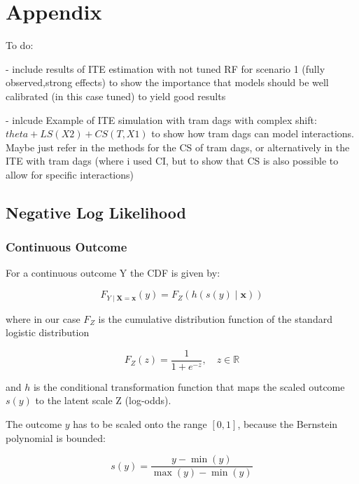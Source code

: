 



\chapter{Appendix}


To do:

- include results of ITE estimation with not tuned RF for scenario 1 (fully observed,strong effects) to show the importance that models should be well calibrated (in this case tuned) to yield good results

- inlcude Example of ITE simulation with tram dags with complex shift: $theta + LS(X2) + CS(T, X1)$ to show how tram dags can model interactions. Maybe just refer in the methods for the CS of tram dags, or alternatively in the ITE with tram dags (where i used CI, but to show that CS is also possible to allow for specific interactions)




\section{Negative Log Likelihood}


\subsection{Continuous Outcome}

For a continuous outcome Y the CDF is given by:

\begin{equation}
F_{Y \mid \mathbf{X} = \mathbf{x}}(y) = F_Z(h(s(y) \mid \mathbf{x}))
\end{equation}

where in our case \( F_Z \) is the cumulative distribution function of the standard logistic distribution

\begin{equation}
F_Z(z) = \frac{1}{1 + e^{-z}}, \quad z \in \mathbb{R}
\end{equation}

and \( h \) is the conditional transformation function that maps the scaled outcome \( s(y) \) to the latent scale Z (log-odds).

The outcome $y$ has to be scaled onto the range $[0, 1]$, because the Bernstein polynomial is bounded:

\begin{equation}
s(y) = \frac{y - \min(y)}{\max(y) - \min(y)}
\end{equation}

